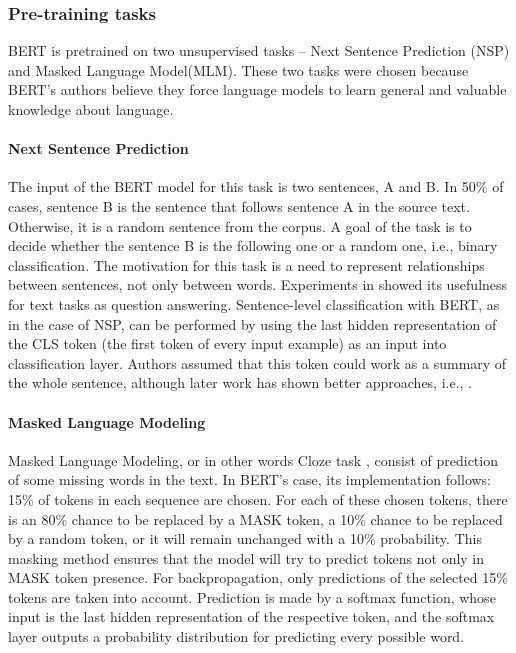 \subsubsection{Pre-training tasks}
BERT is pretrained on two unsupervised tasks -- Next Sentence Prediction (NSP) and Masked Language Model(MLM). These two tasks were chosen because BERT's authors believe they force language models to learn general and valuable knowledge about language.
\paragraph{Next Sentence Prediction}
The input of the BERT model for this task is two sentences, A and B. In 50\% of cases, sentence B is the sentence that follows sentence A in the source text. Otherwise, it is a random sentence from the corpus. A goal of the task is to decide whether the sentence B is the following one or a random one, i.e., binary classification. The motivation for this task is a need to represent relationships between sentences, not only between words. Experiments in \citep{
Devlin2019} showed its usefulness for text tasks as question answering. Sentence-level classification with BERT, as in the case of NSP, can be performed by using the last hidden representation of the CLS token (the first token of every input example) as an input into classification layer. Authors assumed that this token could work as a summary of the whole sentence, although later work has shown better approaches, i.e., \citep{Liu2019}. 
\paragraph{Masked Language Modeling}
Masked Language Modeling, or in other words Cloze task \citep{Taylor1953},
consist of prediction of some missing words in the text. In BERT's case, its implementation follows: 15\% of tokens in each sequence are chosen. For each of these chosen tokens, there is an 80\% chance to be replaced by a MASK token, a 10\% chance to be replaced by a random token, or it will remain unchanged with a 10\% probability. This masking method ensures that the model will try to predict tokens not only in MASK token presence. For backpropagation, only predictions of the selected 15\% tokens are taken into account. Prediction is made by a softmax function, whose input is the last hidden representation of the respective token, and the softmax layer outputs a probability distribution for predicting every possible word. 


